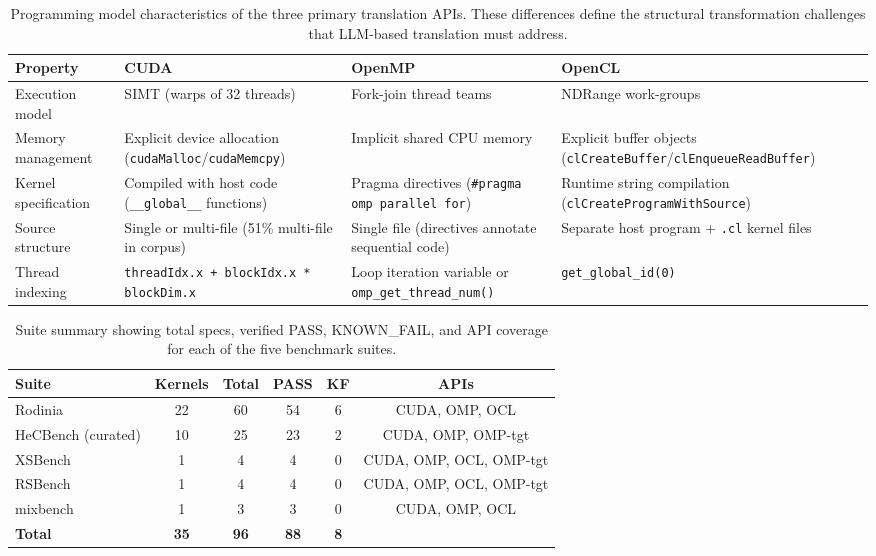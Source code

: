 \begin{table}[htbp]
\centering
\caption{Programming model characteristics of the three primary translation APIs. These differences define the structural transformation challenges that LLM-based translation must address.}
\label{tab:api-characteristics}
\small
\begin{tabular}{@{}lp{4.0cm}p{4.0cm}p{4.0cm}@{}}
\toprule
Property & CUDA & OpenMP & OpenCL \\
\midrule
Execution model & SIMT (warps of 32 threads) & Fork-join thread teams & NDRange work-groups \\
Memory management & Explicit device allocation (\texttt{cudaMalloc}/\texttt{cudaMemcpy}) & Implicit shared CPU memory & Explicit buffer objects (\texttt{clCreateBuffer}/\texttt{clEnqueueReadBuffer}) \\
Kernel specification & Compiled with host code (\texttt{\_\_global\_\_} functions) & Pragma directives (\texttt{\#pragma omp parallel for}) & Runtime string compilation (\texttt{clCreateProgramWithSource}) \\
Source structure & Single or multi-file (51\% multi-file in corpus) & Single file (directives annotate sequential code) & Separate host program + \texttt{.cl} kernel files \\
Thread indexing & \texttt{threadIdx.x + blockIdx.x * blockDim.x} & Loop iteration variable or \texttt{omp\_get\_thread\_num()} & \texttt{get\_global\_id(0)} \\
\bottomrule
\end{tabular}
\end{table}


\begin{table}[htbp]
\centering
\caption{Suite summary showing total specs, verified PASS, KNOWN\_FAIL, and API coverage for each of the five benchmark suites.}
\label{tab:suite-summary}
\small
\begin{tabular}{@{}lccccc@{}}
\toprule
Suite & Kernels & Total & PASS & KF & APIs \\
\midrule
Rodinia & 22 & 60 & 54 & 6 & CUDA, OMP, OCL \\
HeCBench (curated) & 10 & 25 & 23 & 2 & CUDA, OMP, OMP-tgt \\
XSBench & 1 & 4 & 4 & 0 & CUDA, OMP, OCL, OMP-tgt \\
RSBench & 1 & 4 & 4 & 0 & CUDA, OMP, OCL, OMP-tgt \\
mixbench & 1 & 3 & 3 & 0 & CUDA, OMP, OCL \\
\midrule
\textbf{Total} & \textbf{35} & \textbf{96} & \textbf{88} & \textbf{8} & \\
\bottomrule
\end{tabular}
\end{table}


